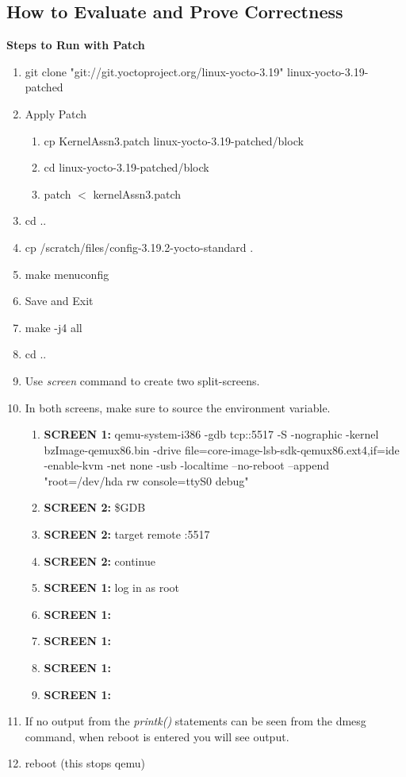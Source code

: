 \documentclass[draftclsnofoot, onecolumn, 10pt, compsoc]{IEEEtran}
\begin{document}
		\subsection{How to Evaluate and Prove Correctness}
			\textbf{Steps to Run with Patch}
			\begin{enumerate}
				\item git clone "git://git.yoctoproject.org/linux-yocto-3.19" linux-yocto-3.19-patched
				\item Apply Patch
				\begin{enumerate}
					\item cp KernelAssn3.patch linux-yocto-3.19-patched/block
					\item cd linux-yocto-3.19-patched/block
					\item patch $<$ kernelAssn3.patch
				\end{enumerate}
				\item cd ..
				\item cp /scratch/files/config-3.19.2-yocto-standard .
				\item make menuconfig
				\item Save and Exit
				\item make -j4 all
				\item cd ..
				\item Use \textit{screen} command to create two split-screens.
				\item In both screens, make sure to source the environment variable.
				\begin{enumerate}
					\item \textbf{SCREEN 1:}
						qemu-system-i386 -gdb tcp::5517 -S -nographic -kernel bzImage-qemux86.bin -drive file=core-image-lsb-sdk-qemux86.ext4,if=ide -enable-kvm -net none -usb -localtime --no-reboot --append "root=/dev/hda rw console=ttyS0 debug"
					\item \textbf{SCREEN 2:} \$GDB
					\item \textbf{SCREEN 2:} target remote :5517
					\item \textbf{SCREEN 2:} continue
					\item \textbf{SCREEN 1:} log in as root
					\item \textbf{SCREEN 1:}
					\item \textbf{SCREEN 1:}
					\item \textbf{SCREEN 1:}
					\item \textbf{SCREEN 1:}
				\end{enumerate}
				\item If no output from the \textit{printk()} statements can be seen from the dmesg command, when reboot is entered you will see output.
				\item reboot (this stops qemu)
			\end{enumerate}
	
\end{document}
